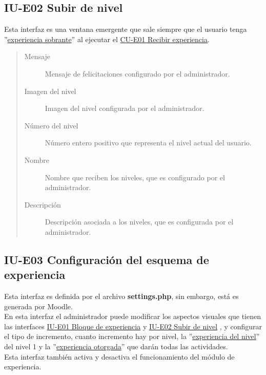 \subsection*{IU-E02 Subir de nivel}
\label{IUE02}

    Esta interfaz es una ventana emergente que sale siempre que el usuario tenga ''\hyperref[table:METerminosExperiencia1]{experiencia sobrante}'' al ejecutar el \hyperref[CU-E01]{CU-E01 Recibir experiencia}.


    \begin{quote}
    \begin{description}
    	\item[Mensaje] Mensaje de felicitaciones configurado por el administrador.
    	\item[Imagen del nivel] Imagen del nivel configurada por el administrador.
    	\item[Número del nivel] Número entero positivo que representa el nivel actual del usuario.
    	\item[Nombre] Nombre que reciben los niveles, que es configurado por el administrador.
    	\item[Descripción] Descripción asociada a los niveles, que es configurada por el administrador.
    \end{description}
    \end{quote}
	\clearpage

\subsection*{IU-E03 Configuración del esquema de experiencia}
\label{IUE03}
    Esta interfaz es definida por el archivo \textbf{settings.php}, sin embargo, está es generada por Moodle.\\
    En esta interfaz el administrador puede modificar los aspectos visuales que tienen las interfaces \hyperref[IUE01]{IU-E01 Bloque de experiencia} y \hyperref[IUE02]{IU-E02 Subir de nivel} , y configurar el tipo de incremento, cuanto incremento hay por nivel, la ''\hyperref[table:METerminosExperiencia1]{experiencia del nivel}'' del nivel 1 y la ''\hyperref[table:METerminosExperiencia1]{experiencia otorgada}'' que darán todas las actividades.\\
    Esta interfaz también activa y desactiva el funcionamiento del módulo de experiencia.\\

